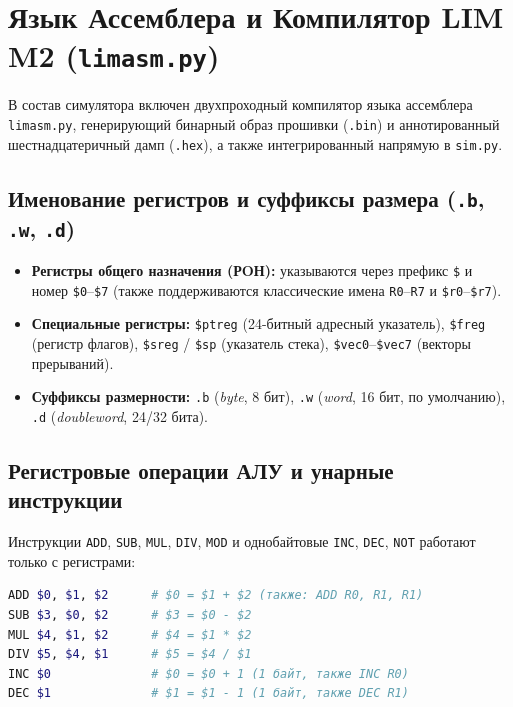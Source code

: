 \documentclass[11pt,a4paper]{article}
\begin{document}
\section{Язык Ассемблера и Компилятор LIM M2 (\texttt{limasm.py})}

В состав симулятора включен двухпроходный компилятор языка ассемблера \texttt{limasm.py}, генерирующий бинарный образ прошивки (\texttt{.bin}) и аннотированный шестнадцатеричный дамп (\texttt{.hex}), а также интегрированный напрямую в \texttt{sim.py}.

\subsection{Именование регистров и суффиксы размера (\texttt{.b}, \texttt{.w}, \texttt{.d})}
\begin{itemize}
    \item \textbf{Регистры общего назначения (РOН):} указываются через префикс \texttt{\$} и номер \texttt{\$0}--\texttt{\$7} (также поддерживаются классические имена \texttt{R0}--\texttt{R7} и \texttt{\$r0}--\texttt{\$r7}).
    \item \textbf{Специальные регистры:} \texttt{\$ptreg} (24-битный адресный указатель), \texttt{\$freg} (регистр флагов), \texttt{\$sreg} / \texttt{\$sp} (указатель стека), \texttt{\$vec0}--\texttt{\$vec7} (векторы прерываний).
    \item \textbf{Суффиксы размерности:} \texttt{.b} (\textit{byte}, 8 бит), \texttt{.w} (\textit{word}, 16 бит, по умолчанию), \texttt{.d} (\textit{doubleword}, 24/32 бита).
\end{itemize}

\subsection{Регистровые операции АЛУ и унарные инструкции}
Инструкции \texttt{ADD}, \texttt{SUB}, \texttt{MUL}, \texttt{DIV}, \texttt{MOD} и однобайтовые \texttt{INC}, \texttt{DEC}, \texttt{NOT} работают только с регистрами:
\begin{lstlisting}[language=bash]
ADD $0, $1, $2      # $0 = $1 + $2 (также: ADD R0, R1, R1)
SUB $3, $0, $2      # $3 = $0 - $2
MUL $4, $1, $2      # $4 = $1 * $2
DIV $5, $4, $1      # $5 = $4 / $1
INC $0              # $0 = $0 + 1 (1 байт, также INC R0)
DEC $1              # $1 = $1 - 1 (1 байт, также DEC R1)
\end{lstlisting}
\end{document}

